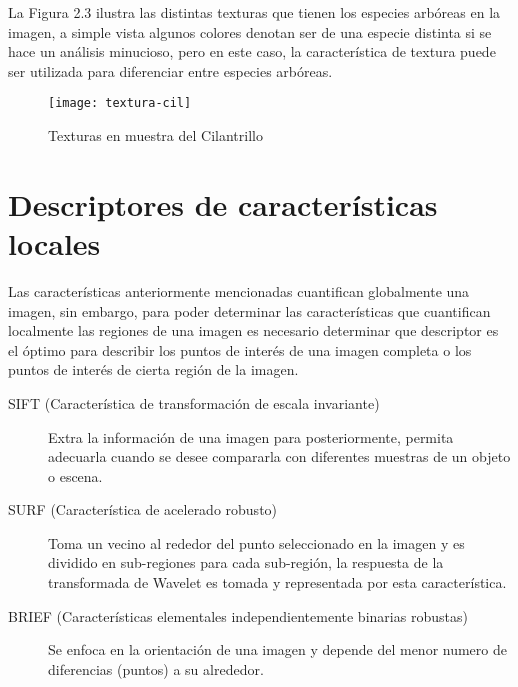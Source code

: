 La Figura 2.3 ilustra las distintas texturas que tienen los especies arbóreas en la imagen, a simple vista algunos colores denotan ser de una especie distinta si se hace un análisis minucioso, pero en este caso, la característica de textura puede ser utilizada para diferenciar entre especies arbóreas.

\begin{figure}[h!]
  \centering
  \begin{minipage}[b]{0.7\textwidth}
    \texttt{[image: textura-cil]}
    \caption{Texturas en muestra del Cilantrillo}
  \end{minipage}
\end{figure}

\section{Descriptores de características locales}
Las características anteriormente mencionadas cuantifican globalmente una imagen, sin embargo, para poder determinar las características que cuantifican localmente las regiones de una imagen es necesario determinar que descriptor es el óptimo para describir los puntos de interés de una imagen completa o los puntos de interés de cierta región de la imagen. 

\begin{description}
\item[SIFT (Característica de transformación de escala invariante)]{Extra la información de una imagen para posteriormente, permita adecuarla cuando se desee compararla con diferentes muestras de un objeto o escena.}
\end{description}

\begin{description}
\item[SURF (Característica de acelerado robusto)]{Toma un vecino al rededor del punto seleccionado en la imagen y es dividido en sub-regiones para cada sub-región, la respuesta de la transformada de Wavelet es tomada y representada por esta característica.}
\end{description}
 
\begin{description}
\item[BRIEF (Características elementales  independientemente binarias robustas)]{Se enfoca en la orientación de una imagen y depende del menor numero de diferencias (puntos) a su alrededor.}
\end{description}

